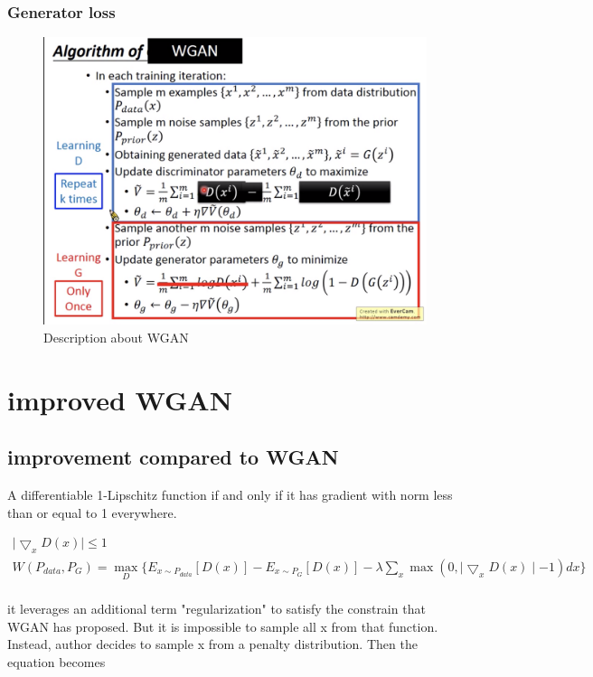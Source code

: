 \documentclass{article}
\begin{document}
\subsubsection{Generator loss}
\begin{figure}[H]
    \centering
    \includegraphics[width=\linewidth]{WGAN_algorithm}
    \caption{Description about WGAN}
\end{figure}


\section{improved WGAN}
\subsection{improvement compared to WGAN}
A differentiable 1-Lipschitz function if and only if it has gradient with norm less than or equal to 1 everywhere.

\begin{equation}
\begin{split}
    \mid \bigtriangledown_{x}D(x) \mid \leq 1  \\
    W(P_{data},P_G)=\max_{D} \{E_{x \sim P_{data}}[D(x)]-E_{x \sim P_{G}}[D(x)]- \lambda \sum_{x} \max(0, \mid \bigtriangledown_{x}D(x) \mid -1)dx \} \\
\end{split}
\end{equation}

it leverages an additional term "regularization" to satisfy the constrain that WGAN has proposed. But it is impossible to sample all x from that function. Instead, author decides to sample x from a penalty distribution. Then the equation becomes
\end{document}
